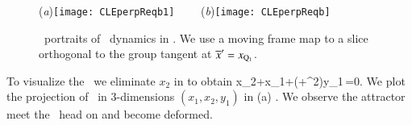 %
\begin{figure}[ht]
\begin{center}
  (\textit{a})\texttt{[image: CLEperpReqb1]}
~~~~(\textit{b})\texttt{[image: CLEperpReqb]}
\end{center}
\caption{
\Statesp\ portraits of \cLe\ dynamics in \reducedsp. We use a
moving frame map to a slice orthogonal to the group tangent
at  ${\overline{x}'}  = x_{\mathrm{Q}_{1}}$.
    }
\label{fig:CLEmfReqb1}
\end{figure}
%

To visualize the \sset\ we eliminate $x_2$ in  to obtain
\beq
	x_2+x_1+\left(+^2\right)y_1\,=0.
We plot the projection of \sset\ in $3$-dimensions $(x_1,x_2,y_1)$ in (a)
.
We observe the attractor meet the \sset\ head on and become deformed. 

